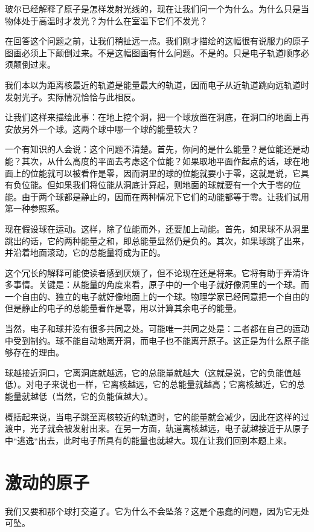 玻尔已经解释了原子是怎样发射光线的，现在让我们问一个为什么。为什么只是当物体处于高温时才发光？为什么在室温下它们不发光？

在回答这个问题之前，让我们稍扯远一点。我们刚才描绘的这幅很有说服力的原子图画必须上下颠倒过来。不是这幅图画有什么问题。不是的。只是电子轨道顺序必须颠倒过来。

我们本以为距离核最近的轨道是能量最大的轨道，因而电子从近轨道跳向远轨道时发射光子。实际情况恰恰与此相反。

让我们这样来描绘此事：在地上挖个洞，把一个球放置在洞底，在洞口的地面上再安放另外一个球。这两个球中哪一个球的能量较大？

一个有知识的人会说：这个问题不清楚。首先，你问的是什么能量？是位能还是动能？其次，从什么高度的平面去考虑这个位能？如果取地平面作起点的话，球在地面上的位能就可以被看作是零，因而洞里的球的位能就要小于零，这就是说，它具有负位能。但如果我们将位能从洞底计算起，则地面的球就要有一个大于零的位能。由于两个球都是静止的，因而在两种情况下它们的动能都等于零。让我们试用第一种参照系。

现在假设球在运动。这样，除了位能而外，还要加上动能。首先，如果球不从洞里跳出的话，它的两种能量之和，即总能量显然仍是负的。其次，如果球跳了出来，并沿着地面滚动，它的总能量将成为正的。

这个冗长的解释可能使读者感到厌烦了，但不论现在还是将来。它将有助于弄清许多事情。关键是：从能量的角度来看，原子中的一个电子就好像洞里的一个球。而一个自由的、独立的电子就好像地面上的一个球。物理学家已经同意把一个自由的但是静止的电子的总能量看作是零，用以计算其余电子的能量。

当然，电子和球并没有很多共同之处。可能唯一共同之处是：二者都在自己的运动中受到制约。球不能自动地离开洞，而电子也不能离开原子。这正是为什么原子能够存在的理由。

球越接近洞口，它离洞底就越远，它的总能量就越大（这就是说，它的负能值越低）。对电子来说也一样，它离核越远，它的总能量就越高；它离核越近，它的总能量就越低（当然，它的负能值越大）。

概括起来说，当电子跳至离核较近的轨道时，它的能量就会减少，因此在这样的过渡中，光子就会被发射出来。在另一方面，轨道离核越远，电子就越接近于从原子中“逃逸“出去，此时电子所具有的能量也就越大。现在让我们回到本题上来。

\section{激动的原子}

我们又要和那个球打交道了。它为什么不会坠落？这是个愚蠢的问题，因为它无处可坠。


